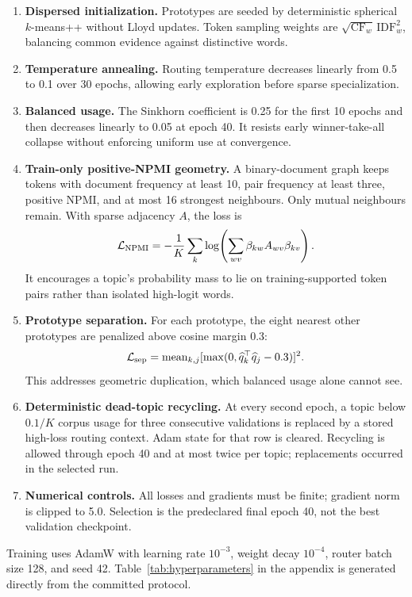 \documentclass[10pt,a4paper]{article}
\begin{document}
\begin{enumerate}
  \item \textbf{Dispersed initialization.} Prototypes are seeded by deterministic
  spherical $k$-means++ without Lloyd updates. Token sampling weights are
  $\sqrt{\mathrm{CF}_w}\,\mathrm{IDF}_w^2$, balancing common evidence against
  distinctive words.
  \item \textbf{Temperature annealing.} Routing temperature decreases linearly
  from 0.5 to 0.1 over 30 epochs, allowing early exploration before sparse
  specialization.
  \item \textbf{Balanced usage.} The Sinkhorn coefficient is 0.25 for the first
  10 epochs and then decreases linearly to 0.05 at epoch 40. It resists early
  winner-take-all collapse without enforcing uniform use at convergence.
  \item \textbf{Train-only positive-NPMI geometry.} A binary-document graph keeps
  tokens with document frequency at least 10, pair frequency at least three,
  positive NPMI, and at most 16 strongest neighbours. Only mutual neighbours
  remain. With sparse adjacency $A$, the loss is
  \[
    \mathcal L_{\rm NPMI}=-\frac1K\sum_k
    \log\!\left(\sum_{wv}\beta_{kw}A_{wv}\beta_{kv}\right).
  \]
  It encourages a topic's probability mass to lie on training-supported token
  pairs rather than isolated high-logit words.
  \item \textbf{Prototype separation.} For each prototype, the eight nearest
  other prototypes are penalized above cosine margin 0.3:
  \[
    \mathcal L_{\rm sep}=\operatorname{mean}_{k,j}
    [\max(0,\widehat q_k^\top\widehat q_j-0.3)]^2.
  \]
  This addresses geometric duplication, which balanced usage alone cannot see.
  \item \textbf{Deterministic dead-topic recycling.} At every second epoch, a
  topic below $0.1/K$ corpus usage for three consecutive validations is replaced
  by a stored high-loss routing context. Adam state for that row is cleared.
  Recycling is allowed through epoch 40 and at most twice per topic;
  \NeuralRecycledTopics{} replacements occurred in the selected run.
  \item \textbf{Numerical controls.} All losses and gradients must be finite;
  gradient norm is clipped to 5.0. Selection is the predeclared final epoch 40,
  not the best validation checkpoint.
\end{enumerate}

Training uses AdamW with learning rate $10^{-3}$, weight decay $10^{-4}$,
router batch size 128, and seed 42. Table~\ref{tab:hyperparameters} in the
appendix is generated directly from the committed protocol.
\end{document}
